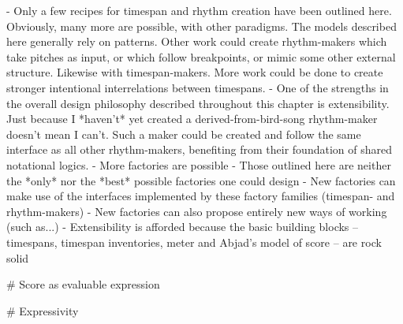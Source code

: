 \begin{markdown}
- Only a few recipes for timespan and rhythm creation have been outlined
  here. Obviously, many more are possible, with other paradigms. The models
  described here generally rely on patterns. Other work could create
  rhythm-makers which take pitches as input, or which follow breakpoints, or
  mimic some other external structure. Likewise with timespan-makers. More
  work could be done to create stronger intentional interrelations between
  timespans.
- One of the strengths in the overall design philosophy described throughout
  this chapter is extensibility. Just because I *haven't* yet created a
  derived-from-bird-song rhythm-maker doesn't mean I can't. Such a maker
  could be created and follow the same interface as all other rhythm-makers,
  benefiting from their foundation of shared notational logics.
- More factories are possible
- Those outlined here are neither the *only* nor the *best* possible
  factories one could design
- New factories can make use of the interfaces implemented by these
  factory families (timespan- and rhythm-makers)
- New factories can also propose entirely new ways of working
  (such as...)
- Extensibility is afforded because the basic building blocks --
  timespans, timespan inventories, meter and Abjad's model of score --
  are rock solid

# Score as evaluable expression

# Expressivity

\end{markdown}